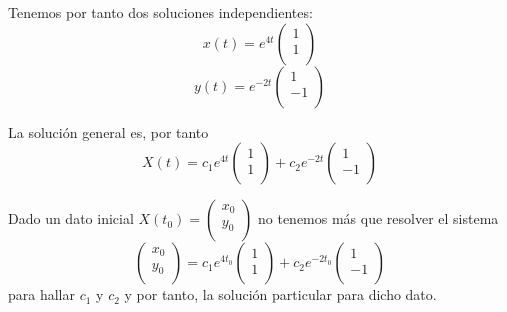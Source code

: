 \documentclass{mathnotes}
\begin{document}
\begin{example} [(Método 1)]
Tenemos por tanto dos soluciones independientes:
$$x(t) = e^{4t}\begin{pmatrix}
1\\1\\
\end{pmatrix}$$
$$y(t) = e^{-2t}\begin{pmatrix}
1\\-1\\
\end{pmatrix} $$

La solución general es, por tanto
$$X(t) = c_1e^{4t}\begin{pmatrix}
1\\1\\
\end{pmatrix} + c_2e^{-2t}\begin{pmatrix}
1\\-1\\
\end{pmatrix}$$

Dado un dato inicial $X(t_0) = \begin{pmatrix}
x_0\\y_0\\
\end{pmatrix}$ no tenemos más que resolver el sistema $$\begin{pmatrix}
x_0\\y_0\\
\end{pmatrix} =  c_1e^{4t_0}\begin{pmatrix}
1\\1\\
\end{pmatrix} + c_2e^{-2t_0}\begin{pmatrix}
1\\-1\\
\end{pmatrix}$$ para hallar $c_1$ y $c_2$ y por tanto, la solución particular para dicho dato.

\end{example}
\end{document}
